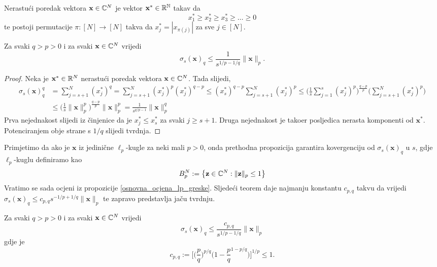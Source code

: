\documentclass[a4paper,twoside,12pt]{memoir} %
\newcommand{\vect}[1]{\mathbf{#1}}
\begin{document}
\begin{defn}
    Nerastu\'ci poredak vektora $\vect{x} \in \C^{N}$ je vektor $\vect{x}^* \in \R^{\N}$ takav da
    $$x^*_1 \geq x^*_2 \geq x^*_3 \geq \dots \geq 0$$
    te postoji permutacije $\pi : [N]\rightarrow[N]$ takva da $x^*_j=|x_{\pi(j)}|$ za sve $j\in [N]$.
\end{defn}
\begin{prop}\label{osnovna_ocjena_lp_greske}
    Za svaki $q > p > 0$ i za svaki $\vect{x}\in \C^{N}$ vrijedi
    $$\sigma_s(\vect{x})_q \leq \frac{1}{s^{1/p - 1/q}}\|\vect{x}\|_p.$$
\end{prop}
\begin{proof}
    Neka je $\vect{x}^* \in \R^N$ nerastu\'ci poredak vektora $\vect{x}\in\C^N$. Tada slijedi,
    \begin{equation*}
    \begin{split} 
        \sigma_s(\vect{x})_q^q &= \sum_{j=s+1}^{N}(x_j^*)^q=\sum_{j=s+1}^{N}(x_j^*)^p(x_j^*)^{q-p} \leq (x_s^*)^{q-p} \sum_{j=s+1}^{N}(x_j^*)^p \leq \bigg(\frac{1}{s}\sum_{j=1}^{s}(x_j^*)^p\bigg)^{\frac{q-p}{p}}\bigg( \sum_{j=s+1}^N(x_j^*)^p\bigg) \\ &\leq \bigg( \frac{1}{s} \|\vect{x}\|_p^p \bigg)^{\frac{q-p}{p}}\|\vect{x}\|_p^p = \frac{1}{s^{q/p-1}}\|\vect{x}\|_p^q
    \end{split}
    \end{equation*}
    Prva nejednakost slijedi iz \v{c}injenice da je $x_j^* \leq x_s^*$ za svaki $j \geq s+1$. Druga nejednakost je tako\dj er posljedica nerasta komponenti od $\vect{x}^*$. Potenciranjem obje strane s $1/q$ slijedi tvrdnja.
\end{proof}
Primjetimo da ako je $\vect{x}$ iz jedini\v{c}ne $\ell_p$-kugle za neki mali $p>0$, onda prethodna propozicija garantira kovergenciju od $\sigma_s(\vect{x})_q$ u $s$, gdje $\ell_p$-kuglu definiramo kao
$$B_p^N := \big\{ \vect{z} \in \C^N : \|\vect{z}\|_p \leq 1\big\}$$
Vratimo se sada ocjeni iz propozicije \ref{osnovna_ocjena_lp_greske}. Sljede\'ci teorem daje najmanju konstantu $c_{p,q}$ takvu da vrijedi $\sigma_s(\vect{x})_q\leq c_{p,q}s^{-1/p+1/q}\|\vect{x}\|_p$ te zapravo predstavlja ja\v{c}u tvrdnju.
\begin{thm}
    Za svaki $q > p > 0$ i za svaki $\vect{x}\in\C^N$ vrijedi
    \begin{equation*}
    \sigma_s(\vect{x})_q \leq \frac{c_{p,q}}{s^{1/p - 1/q}}\|\vect{x}\|_p
    \end{equation*}
    gdje je
    $$
    c_{p,q} := \bigg[ \bigg(\frac{p}{q}\bigg)^{p/q}\bigg( 1-\frac{p}{q}^{1-p/q}\bigg) \bigg]^{1/p}\leq1.
    $$
\end{thm}
\end{document}
